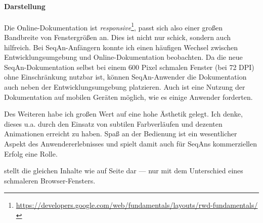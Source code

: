   



\paragraph{Darstellung}

Die Online-Dokumentation ist \textit{responsive}\footnote{\url{https://developers.google.com/web/fundamentals/layouts/rwd-fundamentals/}}, passt sich also einer großen Bandbreite von Fenstergrößen an. Dies ist nicht nur schick, sondern auch hilfreich. Bei SeqAn-Anfängern konnte ich einen häufigen Wechsel zwischen Entwicklungsumgebung und Online-Dokumentation beobachten. Da die neue SeqAn-Dokumentation selbst bei einem 600 Pixel schmalen Fenster (bei 72 DPI) ohne Einschränkung nutzbar ist, können SeqAn-Anwender die Dokumentation auch neben der Entwicklungsumgebung platzieren. Auch ist eine Nutzung der Dokumentation auf mobilen Geräten möglich, wie es einige Anwender forderten.

Des Weiteren habe ich großen Wert auf eine hohe Ästhetik gelegt. Ich denke, dieses u.a. durch den Einsatz von subtilen Farbverläufen und dezenten Animationen erreicht zu haben. Spaß an der Bedienung ist ein wesentlicher Aspekt des Anwendererlebnisses und spielt damit auch für SeqAns kommerziellen Erfolg eine Rolle.

 stellt die gleichen Inhalte wie  auf Seite \pageref{fig:dox-large-all} dar --- nur mit dem Unterschied eines schmaleren Browser-Fensters.

